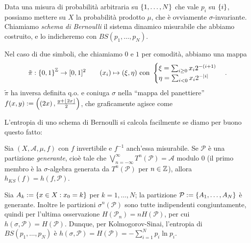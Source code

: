 Data una misura di probabilità arbitraria su $\left\{1,\dots,N\right\}$ che vale $p_i$ su $\left\{i\right\}$, possiamo mettere su $X$
la probabilità prodotto $\mu$, che è ovviamente $\sigma$-invariante. 
Chiamiamo \emph{schema di Bernoulli} il sistema dinamico misurabile che abbiamo costruito, e lo indicheremo con $BS(p_1,\dots,p_N)$.

Nel caso di due simboli, che chiamiamo $0$ e $1$ per comodità, abbiamo una mappa 
\[\tilde{\pi}:\left\{0,1\right\}^{\mathbb{Z}}\to [0,1]^2  \qquad (x_i)\mapsto (\xi,\eta) \mbox{ con }  \begin{cases} \xi=\sum_{i\ge 0}x_i 2^{-(i+1)} \\ \eta=\sum_{i<0}x_i 2^{-\left|i\right|}\end{cases}.\] 
$\tilde{\pi}$ ha inversa definita q.o. e coniuga $\sigma$ nella ``mappa del panettiere'' $f(x,y):=\left(\left(2x\right),\frac{y+\left\lfloor 2x\right\rfloor}{2}\right)$,
che graficamente agisce come

\begin{center}\end{center}


L'entropia di uno schema di Bernoulli si calcola facilmente se diamo per buono questo fatto:

\begin{teo}Sia $(X,\mathcal{A},\mu,f)$ con $f$ invertibile e $f^{-1}$ anch'essa misurabile.
Se $\mathcal{P}$ è una partizione \emph{generante}, cioè tale che $\bigvee_{n=-\infty}^\infty T^n(\mathcal{P})=\mathcal{A}$ modulo $0$
(il primo membro è la $\sigma$-algebra generata da $T^n(\mathcal{P})$ per $n\in\mathbb{Z}$), allora $h_{KS}(f)=h(f,\mathcal{P})$.
\end{teo}

Sia $A_k:=\left\{x\in X:x_0=k\right\}$ per $k=1,\dots,N$; la partizione $\mathcal{P}:=\left\{A_1,\dots,A_N\right\}$ è generante.
Inoltre le partizioni $\sigma^n(\mathcal{P})$ sono tutte indipendenti congiuntamente, quindi per l'ultima osservazione
$H(\mathcal{P}_n)=nH(\mathcal{P})$, per cui $h(\sigma,\mathcal{P})=H(\mathcal{P})$. Dunque, per Kolmogorov-Sinai, l'entropia di 
$BS(p_1,\dots,p_N)$ è $h(\sigma,\mathcal{P})=H(\mathcal{P})=-\sum_{i=1}^N p_i\ln p_i$.

